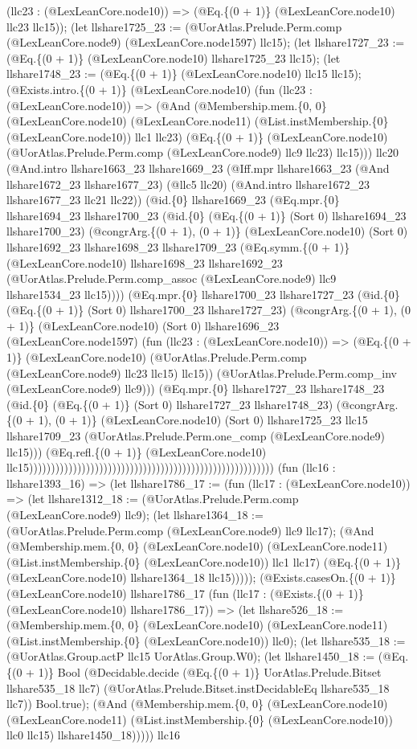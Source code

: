 \documentclass[11pt]{article}
\begin{document}
(llc23 : (@LexLeanCore.node10)) => (@Eq.\{(0 + 1)\} (@LexLeanCore.node10) llc23 llc15)); (let llshare1725\_23 := (@UorAtlas.Prelude.Perm.comp (@LexLeanCore.node9) (@LexLeanCore.node1597) llc15); (let llshare1727\_23 := (@Eq.\{(0 + 1)\} (@LexLeanCore.node10) llshare1725\_23 llc15); (let llshare1748\_23 := (@Eq.\{(0 + 1)\} (@LexLeanCore.node10) llc15 llc15); (@Exists.intro.\{(0 + 1)\} (@LexLeanCore.node10) (fun (llc23 : (@LexLeanCore.node10)) => (@And (@Membership.mem.\{0, 0\} (@LexLeanCore.node10) (@LexLeanCore.node11) (@List.instMembership.\{0\} (@LexLeanCore.node10)) llc1 llc23) (@Eq.\{(0 + 1)\} (@LexLeanCore.node10) (@UorAtlas.Prelude.Perm.comp (@LexLeanCore.node9) llc9 llc23) llc15))) llc20 (@And.intro llshare1663\_23 llshare1669\_23 (@Iff.mpr llshare1663\_23 (@And llshare1672\_23 llshare1677\_23) (@llc5 llc20) (@And.intro llshare1672\_23 llshare1677\_23 llc21 llc22)) (@id.\{0\} llshare1669\_23 (@Eq.mpr.\{0\} llshare1694\_23 llshare1700\_23 (@id.\{0\} (@Eq.\{(0 + 1)\} (Sort 0) llshare1694\_23 llshare1700\_23) (@congrArg.\{(0 + 1), (0 + 1)\} (@LexLeanCore.node10) (Sort 0) llshare1692\_23 llshare1698\_23 llshare1709\_23 (@Eq.symm.\{(0 + 1)\} (@LexLeanCore.node10) llshare1698\_23 llshare1692\_23 (@UorAtlas.Prelude.Perm.comp\_assoc (@LexLeanCore.node9) llc9 llshare1534\_23 llc15)))) (@Eq.mpr.\{0\} llshare1700\_23 llshare1727\_23 (@id.\{0\} (@Eq.\{(0 + 1)\} (Sort 0) llshare1700\_23 llshare1727\_23) (@congrArg.\{(0 + 1), (0 + 1)\} (@LexLeanCore.node10) (Sort 0) llshare1696\_23 (@LexLeanCore.node1597) (fun (llc23 : (@LexLeanCore.node10)) => (@Eq.\{(0 + 1)\} (@LexLeanCore.node10) (@UorAtlas.Prelude.Perm.comp (@LexLeanCore.node9) llc23 llc15) llc15)) (@UorAtlas.Prelude.Perm.comp\_inv (@LexLeanCore.node9) llc9))) (@Eq.mpr.\{0\} llshare1727\_23 llshare1748\_23 (@id.\{0\} (@Eq.\{(0 + 1)\} (Sort 0) llshare1727\_23 llshare1748\_23) (@congrArg.\{(0 + 1), (0 + 1)\} (@LexLeanCore.node10) (Sort 0) llshare1725\_23 llc15 llshare1709\_23 (@UorAtlas.Prelude.Perm.one\_comp (@LexLeanCore.node9) llc15))) (@Eq.refl.\{(0 + 1)\} (@LexLeanCore.node10) llc15)))))))))))))))))))))))))))))))))))))))))))))))))))))))) (fun (llc16 : llshare1393\_16) => (let llshare1786\_17 := (fun (llc17 : (@LexLeanCore.node10)) => (let llshare1312\_18 := (@UorAtlas.Prelude.Perm.comp (@LexLeanCore.node9) llc9); (let llshare1364\_18 := (@UorAtlas.Prelude.Perm.comp (@LexLeanCore.node9) llc9 llc17); (@And (@Membership.mem.\{0, 0\} (@LexLeanCore.node10) (@LexLeanCore.node11) (@List.instMembership.\{0\} (@LexLeanCore.node10)) llc1 llc17) (@Eq.\{(0 + 1)\} (@LexLeanCore.node10) llshare1364\_18 llc15))))); (@Exists.casesOn.\{(0 + 1)\} (@LexLeanCore.node10) llshare1786\_17 (fun (llc17 : (@Exists.\{(0 + 1)\} (@LexLeanCore.node10) llshare1786\_17)) => (let llshare526\_18 := (@Membership.mem.\{0, 0\} (@LexLeanCore.node10) (@LexLeanCore.node11) (@List.instMembership.\{0\} (@LexLeanCore.node10)) llc0); (let llshare535\_18 := (@UorAtlas.Group.actP llc15 UorAtlas.Group.W0); (let llshare1450\_18 := (@Eq.\{(0 + 1)\} Bool (@Decidable.decide (@Eq.\{(0 + 1)\} UorAtlas.Prelude.Bitset llshare535\_18 llc7) (@UorAtlas.Prelude.Bitset.instDecidableEq llshare535\_18 llc7)) Bool.true); (@And (@Membership.mem.\{0, 0\} (@LexLeanCore.node10) (@LexLeanCore.node11) (@List.instMembership.\{0\} (@LexLeanCore.node10)) llc0 llc15) llshare1450\_18))))) llc16 
\end{document}
